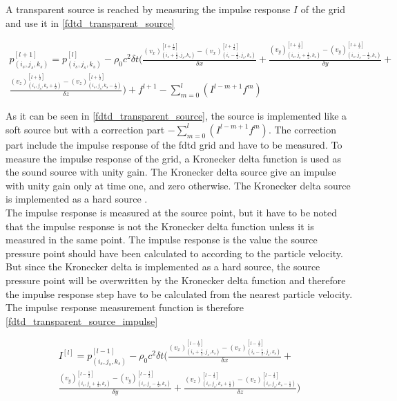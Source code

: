 A transparent source is reached by measuring the impulse response $I$ of the grid and use it in \autoref{fdtd_transparent_source}

\begin{multline}\label{fdtd_transparent_source}
p_{(i_{s},j_{s},k_{s})}^{[l+1]}=p_{(i_{s},j_{s},k_{s})}^{[l]} - \rho_0 c^2 \delta t  \Biggl( \frac{(v_x)_{(i_{s}+\frac{1}{2},j_{s},k_{s})}^{[l+\frac{1}{2}]} - (v_x)_{(i_{s}-\frac{1}{2},j_{s},k_{s})}^{[l+\frac{1}{2}]}}{\delta x} +
 \frac{(v_y)_{(i_{s},j_{s}+\frac{1}{2},k_{s})}^{[l+\frac{1}{2}]}-(v_y)_{(i_{s},j_{s}-\frac{1}{2},k_{s})}^{[l+\frac{1}{2}]}}{\delta y} + \\ 
 \frac{(v_z)_{(i_{s},j_{s},k_{s}+\frac{1}{2})}^{[l+\frac{1}{2}]}-(v_z)_{(i_{s},j_{s},k_{s}-\frac{1}{2})}^{[l+\frac{1}{2}]}}{\delta z} \Biggr)
+f^{l+1}-\sum_{m=0}^{l} \left( I^{l-m+1}f^m \right)
\end{multline}

        \startexplain
    \stopexplain

As it can be seen in \autoref{fdtd_transparent_source}, the source is implemented like a soft source but with a correction part $-\sum_{m=0}^{l} \left( I^{l-m+1}f^m \right)$. The correction part include the impulse response of the \gls{fdtd} grid and have to be measured. To measure the impulse response of the grid, a Kronecker delta function is used as the sound source with unity gain. The Kronecker delta source give an impulse with unity gain only at time one, and zero otherwise. The Kronecker delta source is implemented as a hard source \citep{FDTDtransparent}. \\


The impulse response is measured at the source point, but it have to be noted that the impulse response is not the Kronecker delta function unless it is measured in the same point. The impulse response is the value the source pressure point should have been calculated to according to the particle velocity. But since the Kronecker delta is implemented as a hard source, the source pressure point will be overwritten by the Kronecker delta function and therefore the impulse response step have to be calculated from the nearest particle velocity. The impulse response measurement function is therefore \autoref{fdtd_transparent_source_impulse}

\begin{multline}\label{fdtd_transparent_source_impulse}
I^{[l]}=p_{(i_{s},j_{s},k_{s})}^{[l-1]} - \rho_0 c^2 \delta t  \Biggl( \frac{(v_x)_{(i_{s}+\frac{1}{2},j_{s},k_{s})}^{[l-\frac{1}{2}]} - (v_x)_{(i_{s}-\frac{1}{2},j_{s},k_{s})}^{[l-\frac{1}{2}]}}{\delta x} +\\
 \frac{(v_y)_{(i_{s},j_{s}+\frac{1}{2},k_{s})}^{[l-\frac{1}{2}]}-(v_y)_{(i_{s},j_{s}-\frac{1}{2},k_{s})}^{[l-\frac{1}{2}]}}{\delta y} +  
 \frac{(v_z)_{(i_{s},j_{s},k_{s}+\frac{1}{2})}^{[l-\frac{1}{2}]}-(v_z)_{(i_{s},j_{s},k_{s}-\frac{1}{2})}^{[l-\frac{1}{2}]}}{\delta z} \Biggr)
\end{multline}


